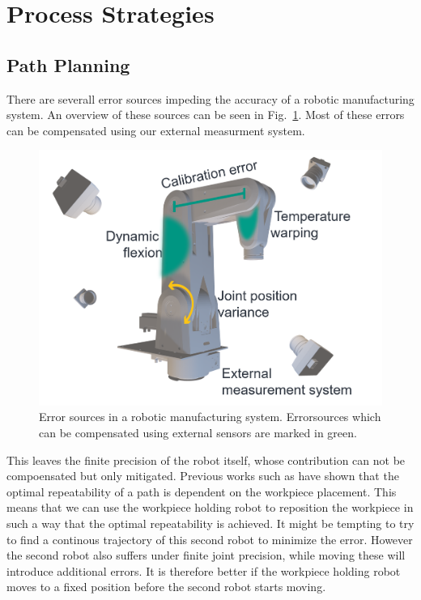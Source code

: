 \documentclass[5p,times,procedia]{elsarticle}
\begin{document}
\section{Process Strategies}
\subsection{Path Planning}
There are severall error sources impeding the accuracy of a robotic manufacturing system.
An overview of these sources can be seen in Fig.~\ref{fig:error_sources}.
Most of these errors can be compensated using our external measurment system.
\begin{figure}[h]
\centering
\includegraphics[width=\columnwidth]{graphics/error_sources.png}
\caption{Error sources in a robotic manufacturing system. Errorsources which can be compensated using external sensors are marked in green.}
\label{fig:error_sources}
\end{figure}
This leaves the finite precision of the robot itself, whose contribution can not be compoensated but only mitigated.
Previous works such as \cite{previous_work} have shown that the optimal repeatability of a path is dependent on the workpiece placement.
This means that we can use the workpiece holding robot to reposition the workpiece in such a way that the optimal repeatability is achieved.
It might be tempting to try to find a continous trajectory of this second robot to minimize the error.
However the second robot also suffers under finite joint precision, while moving these will introduce additional errors.
It is therefore better if the workpiece holding robot moves to a fixed position before the second robot starts moving.
\end{document}
